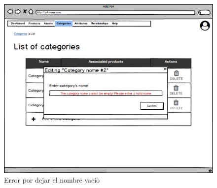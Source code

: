 \begin{figure}[H]
    \includegraphics[width=1\linewidth]{mockups/RF4.3_2.png}
    \caption{Error por dejar el nombre vacío}
   \end{figure}
\vspace{1.0cm}

\newpage %